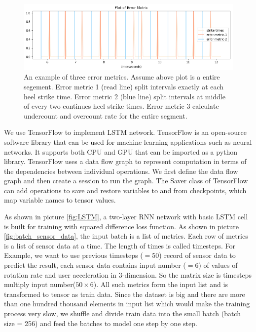 \documentclass[11pt]{article}
\begin{document}
{\begin{figure}[ht]
\centering
\includegraphics[scale=0.6]{error_metric}
\caption{An example of three error metrics. Assume above plot is a entire segement. Error metric 1 (read line) split intervals exactly at each heel strike time. Error metric 2 (blue line) split intervals at middle of every two continues heel strike times. Error metric 3 calculate undercount and overcount rate for the entire segment.}
\label{fig:error_metric}
\end{figure}

We use TensorFlow to implement LSTM network. TensorFlow is an open-source software library that can be used for machine learning applications such as neural networks. It supports both CPU and GPU that can be imported as a python library. TensorFlow uses a data flow graph to represent computation in terms of the dependencies between individual operations. We first define the data flow graph and then create a session to run the graph. The Saver class of TensorFlow can add operations to save and restore variables to and from checkpoints, which map variable names to tensor values.

As shown in picture \ref{fig:LSTM}, a two-layer RNN network with basic LSTM cell is built for training with squared difference loss function. 
As shown in picture \ref{fig:batch_sensor_data}, the input batch is a list of metrics. Each row of metrics is a list of sensor data at a time. The length of times is called timesteps.
For Example, we want to use previous timesteps ($=50$) record of sensor data to predict the result, each sensor data contains input number ($=6$) of values of rotation rate and user acceleration in 3-dimension. So the matrix size is timesteps multiply input number($50 \times 6$). All such metrics form the input list and is transformed to tensor as train data. Since the dataset is big and there are more than one hundred thousand elements in input list which would make the training process very slow, we shuffle and divide train data into the small batch (batch size = 256) and feed the batches to model one step by one step.

}
\end{document}
